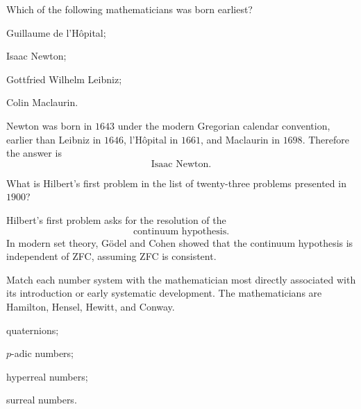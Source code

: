     \begin{expectedproblem}
        Which of the following mathematicians was born earliest?
        \begin{problemchoices}
            \item Guillaume de l'H\^opital;
            \item Isaac Newton;
            \item Gottfried Wilhelm Leibniz;
            \item Colin Maclaurin.
        \end{problemchoices}
    \end{expectedproblem}

    \begin{solution}
        Newton was born in $1643$ under the modern Gregorian calendar
        convention, earlier than Leibniz in $1646$, l'H\^opital in $1661$, and
        Maclaurin in $1698$. Therefore the answer is
        \[
            \boxed{\text{Isaac Newton}}.
        \]
    \end{solution}

    \begin{expectedproblem}
        What is Hilbert's first problem in the list of twenty-three problems
        presented in $1900$?
    \end{expectedproblem}

    \begin{solution}
        Hilbert's first problem asks for the resolution of the
        \[
            \boxed{\text{continuum hypothesis}}.
        \]
        In modern set theory, Gödel and Cohen showed that the continuum
        hypothesis is independent of ZFC, assuming ZFC is consistent.
    \end{solution}

    \begin{expectedproblem}
        Match each number system with the mathematician most directly
        associated with its introduction or early systematic development. The
        mathematicians are Hamilton, Hensel, Hewitt, and Conway.
        \begin{problemchoices}
            \item quaternions;
            \item $p$-adic numbers;
            \item hyperreal numbers;
            \item surreal numbers.
        \end{problemchoices}
    \end{expectedproblem}

